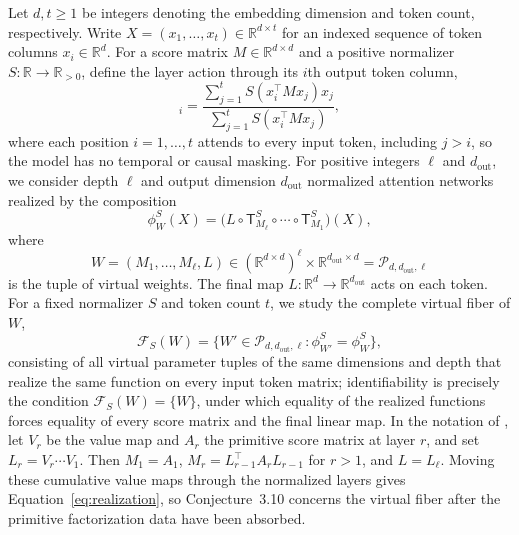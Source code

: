 \documentclass[mlmain]{jmlr}
\newcommand{\R}{\mathbb{R}}
\newcommand{\cF}{\mathcal{F}}
\newcommand{\cP}{\mathcal{P}}
\newcommand{\T}{\mathsf{T}}
\begin{document}
Let $d,t\ge1$ be integers denoting the embedding dimension and token count, respectively.
Write $X=(x_1,\ldots,x_t)\in\R^{d\times t}$ for an indexed sequence of
token columns $x_i\in\R^d$.  For a score matrix $M\in\R^{d\times d}$ and
a positive normalizer $S:\R\to\R_{>0}$, define the layer action through
its $i$th output token column,
\begin{equation}
 [\T_M^S(X)]_i
 =\frac{\sum_{j=1}^t S(x_i^\top Mx_j)x_j}
        {\sum_{j=1}^t S(x_i^\top Mx_j)},
 \label{eq:layer}
\end{equation}
where each position $i=1,\ldots,t$ attends to every input token, including
$j>i$, so the model has no temporal or causal masking.
For positive integers $\ell$ and $d_{\mathrm{out}}$, we consider 
depth
$\ell$ and output dimension $d_{\mathrm{out}}$ normalized attention networks realized by the composition 
\begin{equation}
 \phi_W^S(X)=\bigl(L\circ\T_{M_\ell}^S\circ\cdots\circ\T_{M_1}^S\bigr)(X),
 \label{eq:realization}
\end{equation}
where
\begin{equation}
 W=(M_1,\ldots,M_\ell,L)\in
 (\R^{d\times d})^\ell\times\R^{d_{\mathrm{out}}\times d} =
 \cP_{d,d_{\mathrm{out}},\ell}
\end{equation}
is the tuple of virtual weights.  The final map
$L:\R^d\to\R^{d_{\mathrm{out}}}$ acts on each token. For a fixed normalizer
$S$ and token count $t$, we study the complete virtual fiber of $W$,
\begin{equation}
 \cF_S(W)=\{W'\in\cP_{d,d_{\mathrm{out}},\ell}:
                    \phi_{W'}^S=\phi_W^S\},
 \label{eq:fiber}
\end{equation}
consisting of all virtual parameter tuples of the same dimensions and depth
that realize the same function on every input token matrix; identifiability
is precisely the condition $\cF_S(W)=\{W\}$, under which equality of the
realized functions forces equality of every score matrix and the final
linear map.
In the notation of \citet[Section~3.3, Eq.~(8)]{henry2025}, let $V_r$ be the
value map and $A_r$ the primitive score matrix at layer $r$, and set
$L_r=V_r\cdots V_1$.  Then $M_1=A_1$, $M_r=L_{r-1}^\top A_rL_{r-1}$ for
$r>1$, and $L=L_\ell$.  Moving these cumulative value maps through the
normalized layers gives Equation~\eqref{eq:realization}, so Conjecture~3.10
concerns the virtual fiber after the primitive factorization data have been
absorbed.
\end{document}
